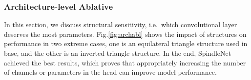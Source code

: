 \subsubsection{Architecture-level Ablative}

In this section, we discuss structural sensitivity, i.e.\ which convolutional layer deserves the most parameters. Fig.\ref{fig:archabl} shows the impact of structures on performance in two extreme cases, one is an equilateral triangle structure used in base, and the other is an inverted triangle structure. In the end, SpindleNet achieved the best results, which proves that appropriately increasing the number of channels or parameters in the head can improve model performance.

